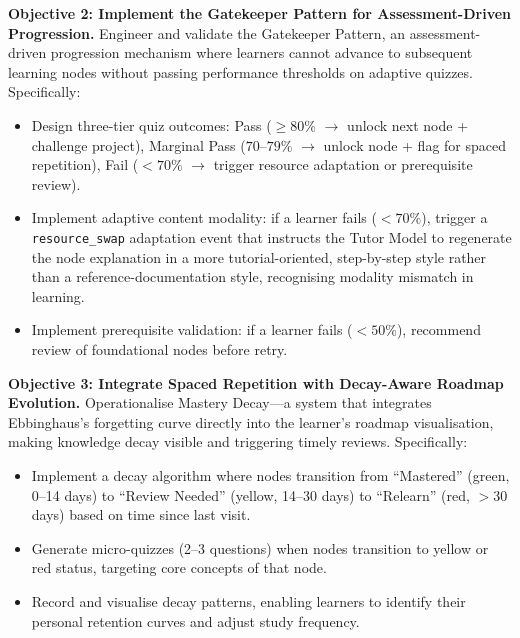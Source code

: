 \textbf{Objective 2: Implement the Gatekeeper Pattern for Assessment-Driven Progression.} Engineer and validate the Gatekeeper Pattern, an assessment-driven progression mechanism where learners cannot advance to subsequent learning nodes without passing performance thresholds on adaptive quizzes. Specifically:
\begin{itemize}
    \item Design three-tier quiz outcomes: Pass ($\ge 80\%$ $\rightarrow$ unlock next node + challenge project), Marginal Pass ($70$--$79\%$ $\rightarrow$ unlock node + flag for spaced repetition), Fail ($<70\%$ $\rightarrow$ trigger resource adaptation or prerequisite review).
    \item Implement adaptive content modality: if a learner fails ($<70\%$), trigger a \texttt{resource\_swap} adaptation event that instructs the Tutor Model to regenerate the node explanation in a more tutorial-oriented, step-by-step style rather than a reference-documentation style, recognising modality mismatch in learning.
    \item Implement prerequisite validation: if a learner fails ($<50\%$), recommend review of foundational nodes before retry.
\end{itemize}

\textbf{Objective 3: Integrate Spaced Repetition with Decay-Aware Roadmap Evolution.} Operationalise Mastery Decay---a system that integrates Ebbinghaus's forgetting curve directly into the learner's roadmap visualisation, making knowledge decay visible and triggering timely reviews. Specifically:
\begin{itemize}
    \item Implement a decay algorithm where nodes transition from \enquote{Mastered} (green, 0--14 days) to \enquote{Review Needed} (yellow, 14--30 days) to \enquote{Relearn} (red, $>30$ days) based on time since last visit.
    \item Generate micro-quizzes (2--3 questions) when nodes transition to yellow or red status, targeting core concepts of that node.
    \item Record and visualise decay patterns, enabling learners to identify their personal retention curves and adjust study frequency.
\end{itemize}

